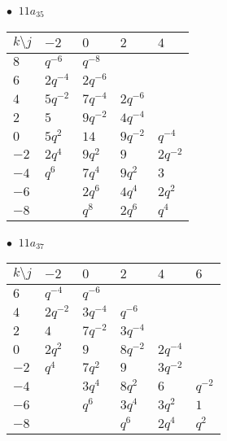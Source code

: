 \begin{minipage}{\linewidth}
$\bullet\ $ $11a_{35}$ \vspace{0.5em} \\
\begin{tabular}{l|llll}
$k \setminus j$ & $-2$ & $0$ & $2$ & $4$ \\
\hline
$8$ & $q^{-6}$ & $q^{-8}$ &  &  \\
$6$ & $2q^{-4}$ & $2q^{-6}$ &  &  \\
$4$ & $5q^{-2}$ & $7q^{-4}$ & $2q^{-6}$ &  \\
$2$ & $5$ & $9q^{-2}$ & $4q^{-4}$ &  \\
$0$ & $5q^{2}$ & $14$ & $9q^{-2}$ & $q^{-4}$ \\
$-2$ & $2q^{4}$ & $9q^{2}$ & $9$ & $2q^{-2}$ \\
$-4$ & $q^{6}$ & $7q^{4}$ & $9q^{2}$ & $3$ \\
$-6$ &  & $2q^{6}$ & $4q^{4}$ & $2q^{2}$ \\
$-8$ &  & $q^{8}$ & $2q^{6}$ & $q^{4}$ \\
\end{tabular}
\vspace{2em}
\end{minipage}
%
\begin{minipage}{\linewidth}
$\bullet\ $ $11a_{37}$ \vspace{0.5em} \\
\begin{tabular}{l|lllll}
$k \setminus j$ & $-2$ & $0$ & $2$ & $4$ & $6$ \\
\hline
$6$ & $q^{-4}$ & $q^{-6}$ &  &  &  \\
$4$ & $2q^{-2}$ & $3q^{-4}$ & $q^{-6}$ &  &  \\
$2$ & $4$ & $7q^{-2}$ & $3q^{-4}$ &  &  \\
$0$ & $2q^{2}$ & $9$ & $8q^{-2}$ & $2q^{-4}$ &  \\
$-2$ & $q^{4}$ & $7q^{2}$ & $9$ & $3q^{-2}$ &  \\
$-4$ &  & $3q^{4}$ & $8q^{2}$ & $6$ & $q^{-2}$ \\
$-6$ &  & $q^{6}$ & $3q^{4}$ & $3q^{2}$ & $1$ \\
$-8$ &  &  & $q^{6}$ & $2q^{4}$ & $q^{2}$ \\
\end{tabular}
\vspace{2em}
\end{minipage}
%
